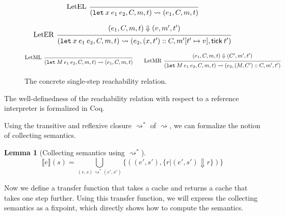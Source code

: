 \documentclass[acmsmall,screen,review]{acmart}
\theoremstyle{definition}
\newtheorem{lem}{Lemma}[section]
\newcommand*{\cons}{::}
\newcommand*{\mem}{m}
\newcommand*{\sembracket}[1]{\lBrack{#1}\rBrack}
\newcommand*{\tick}{\mathsf{tick}}
\begin{document}
\begin{figure}[htb]
  \[
    \begin{prooftree}
      \infer[left label=LetEL]0{
      (\mathtt{let}\:x\:e_1\:e_2, C, \mem, t)
      \rightsquigarrow
      (e_{1}, C, \mem, t)
      }
    \end{prooftree}
  \]

  \[
    \begin{prooftree}
      \hypo{
        \begin{matrix}
          (e_{1}, C, \mem, t)
          \Downarrow
          (v, \mem', t')
        \end{matrix}
      }
      \infer[left label=LetER]1{
      (\mathtt{let}\:x\:e_1\:e_2, C, \mem, t)
      \rightsquigarrow
      (e_{2}, (x, t')\cons C, \mem'[t'\mapsto v], \tick\:t')
      }
    \end{prooftree}
  \]

  \[
    \begin{prooftree}
      \infer[left label=LetML]0{
      (\mathtt{let}\:M\:e_{1}\:e_{2}, C, \mem, t)
      \rightsquigarrow
      (e_{1}, C, \mem, t)
      }
    \end{prooftree}\qquad
    \begin{prooftree}
      \hypo{
        \begin{matrix}
          (e_{1}, C, \mem, t)
          \Downarrow
          (C', \mem', t')
        \end{matrix}
      }
      \infer[left label=LetMR]1{
      (\mathtt{let}\:M\:e_{1}\:e_{2}, C, \mem, t)
      \rightsquigarrow
      (e_{2}, (M, C')\cons C, \mem', t')
      }
    \end{prooftree}
  \]
  \caption{The concrete single-step reachability relation.}
  \label{fig:concreach}
\end{figure}
The well-definedness of the reachability relation with respect to a reference interpreter is formalized in Coq.

Using the transitive and reflexive closure $\rightsquigarrow^{*}$ of $\rightsquigarrow$, we can formalize the notion of collecting semantics.

\begin{lem}[Collecting semantics using $\rightsquigarrow^{*}$]
  \[
    \sembracket{e}(s)=\bigcup_{(e,s)\rightsquigarrow^{*}(e',s')}\{((e',s'),\{r|(e',s')\Downarrow r\})\}
  \]
\end{lem}

Now we define a transfer function that takes a cache and returns a cache that takes one step further.
Using this transfer function, we will express the collecting semantics as a fixpoint, which directly shows how to compute the semantics.
\end{document}
